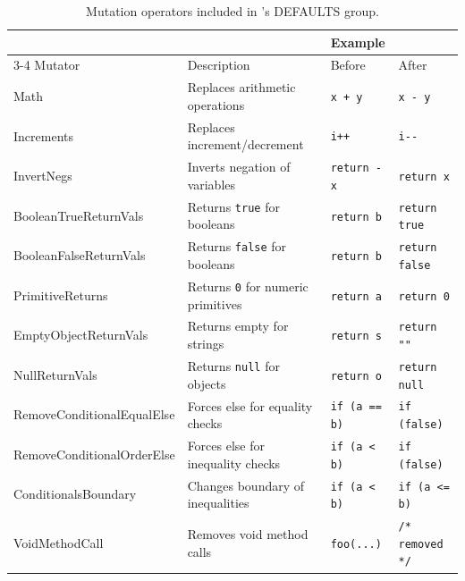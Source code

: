 \begin{table}[t]
  \caption{Mutation operators included in \ToolPit{}'s DEFAULTS group.}
  \label{tab:pit-mutators}
  \begin{tabular}{l l l l}
    \toprule
    &&\multicolumn{2}{l}{Example} \\
    \cmidrule{3-4}
    Mutator & Description  & Before & After\\
    \midrule
    Math                       & Replaces arithmetic operations            & \texttt{x + y}       & \texttt{x - y} \\
    Increments                 & Replaces increment/decrement              & \texttt{i++}         & \texttt{i{-}{-}} \\
    InvertNegs                 & Inverts negation of variables             & \texttt{return -x}   & \texttt{return x} \\
    \midrule
    BooleanTrueReturnVals      & Returns \texttt{true} for booleans        & \texttt{return b}    & \texttt{return true} \\
    BooleanFalseReturnVals     & Returns \texttt{false} for booleans       & \texttt{return b}    & \texttt{return false} \\
    PrimitiveReturns           & Returns \texttt{0} for numeric primitives & \texttt{return a}    & \texttt{return 0} \\
    EmptyObjectReturnVals      & Returns empty for strings                 & \texttt{return s}    & \texttt{return ""} \\
    NullReturnVals             & Returns \texttt{null} for objects         & \texttt{return o}    & \texttt{return null} \\
    \midrule
    RemoveConditionalEqualElse & Forces else for equality checks           & \texttt{if (a == b)} & \texttt{if (false)} \\
    RemoveConditionalOrderElse & Forces else for inequality checks         & \texttt{if (a < b)}  & \texttt{if (false)} \\
    ConditionalsBoundary       & Changes boundary of inequalities          & \texttt{if (a < b)}  & \texttt{if (a <= b)} \\
    \midrule
    VoidMethodCall             & Removes void method calls                 & \texttt{foo(...)}    & \texttt{/* removed */} \\
    \bottomrule
  \end{tabular}
\end{table}

